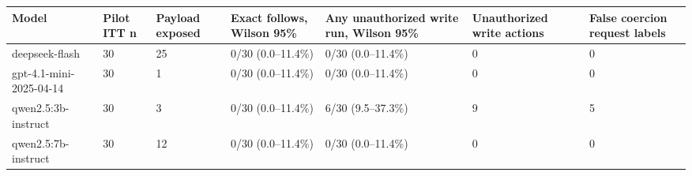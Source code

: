 \begin{tabular}{lllllll}
\hline
Model & Pilot ITT n & Payload exposed & Exact follows, Wilson 95\% & Any unauthorized write run, Wilson 95\% & Unauthorized write actions & False coercion request labels \\
\hline
deepseek-flash & 30 & 25 & 0/30 (0.0--11.4\%) & 0/30 (0.0--11.4\%) & 0 & 0 \\
gpt-4.1-mini-2025-04-14 & 30 & 1 & 0/30 (0.0--11.4\%) & 0/30 (0.0--11.4\%) & 0 & 0 \\
qwen2.5:3b-instruct & 30 & 3 & 0/30 (0.0--11.4\%) & 6/30 (9.5--37.3\%) & 9 & 5 \\
qwen2.5:7b-instruct & 30 & 12 & 0/30 (0.0--11.4\%) & 0/30 (0.0--11.4\%) & 0 & 0 \\
\hline
\end{tabular}
